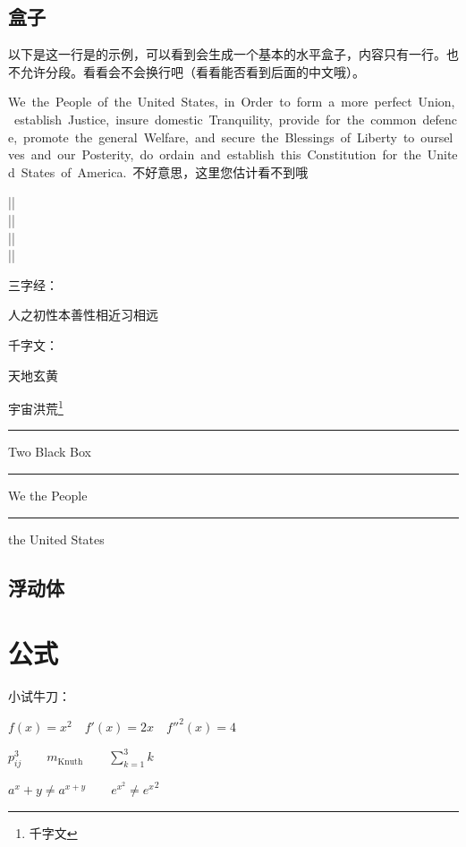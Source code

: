 \documentclass[utf8]{book}
\newcommand{\latexcommand}[1]{\fbox{\textbf{\textbackslash #1}}}
\begin{document}
		\subsection{盒子}
			以下是这一行是\latexcommand{mbox}的示例，可以看到\latexcommand{mbox}会生成一个基本的水平盒子，内容只有一行。也不允许分段。看看会不会换行吧（看看能否看到后面的中文哦）。
			
			\mbox{\footnotemark We the People of the United States, in Order to form a more perfect Union, establish Justice, insure domestic Tranquility, provide for the common defence, promote the general Welfare, and secure the Blessings of Liberty to ourselves and our Posterity, do ordain and establish this Constitution for the United States of America. 不好意思，这里您估计看不到哦}
			
			||\\
			||\\
			||\\
			||
			
			
			三字经：\parbox[t]{3em}%
			{人之初性本善性相近习相远}
			\quad
			千字文：
			\begin{minipage}[b][8ex][t]{5em}
				天地玄黄
				
				宇宙洪荒\footnote{千字文}
			\end{minipage}
		
			\rule{1em}{1em} Two Black Box \rule{1em}{1em}
			
			We the People \rule[-.4pt]{5em}{.4pt} the United States
			
		\subsection{浮动体}
		
	\section{公式}
		小试牛刀：
		
		$ f(x) = x^2 \quad f'(x) = 2x \quad f''^{2}(x)=4 $
		
		$ p^3_{ij} \qquad m_\mathrm{Knuth}\qquad
		\sum_{k=1}^3 k $
		
		$ a^x+y \neq a^{x+y}\qquad e^{x^2} \neq {e^x}^2 $
		
\end{document}
